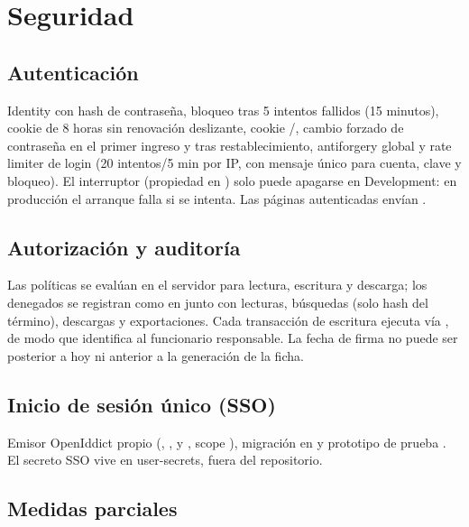 \section{Seguridad}

\subsection{Autenticación}

Identity con hash de contraseña, bloqueo tras 5 intentos fallidos (15 minutos),
cookie de 8 horas sin renovación deslizante, cookie
/, cambio forzado de contraseña en el primer
ingreso y tras restablecimiento, antiforgery global y rate limiter de login
(20 intentos/5 min por IP, con mensaje único para cuenta, clave y bloqueo).
El interruptor  (propiedad
 en ) solo puede apagarse
en Development: en producción el arranque falla si se intenta. Las páginas autenticadas
envían .

\subsection{Autorización y auditoría}

Las políticas  se evalúan en el servidor para lectura,
escritura y descarga; los denegados se registran como  en
 junto con lecturas, búsquedas (solo hash del
término), descargas y exportaciones. Cada transacción de escritura ejecuta
 vía , de
modo que  identifica al funcionario responsable.
La fecha de firma no puede ser posterior a hoy ni anterior a la generación
de la ficha.

\subsection{Inicio de sesión único (SSO)}

Emisor OpenIddict propio (,
,  y
, scope ), migración
 en  y prototipo de prueba
. El secreto SSO vive en user-secrets, fuera
del repositorio.

\subsection{Medidas parciales}

